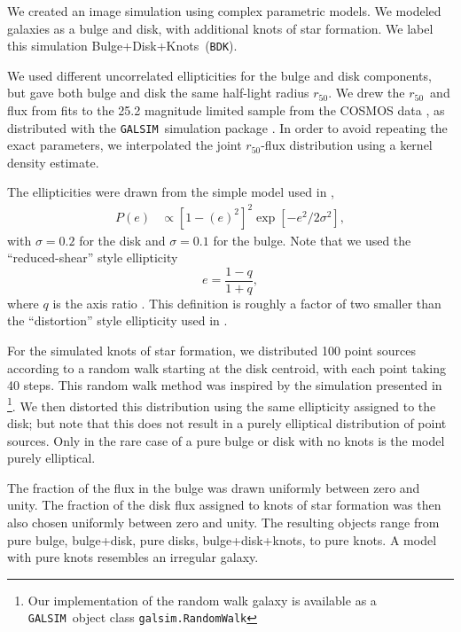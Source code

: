 \documentclass[iop, twocolappendix, appendixfloats, numberedappendix, apj]{emulateapj}
\newcommand{\hlr}{$r_{50}$}
\newcommand{\bdkfull}{Bulge+Disk+Knots}
\newcommand{\bdksim}{\texttt{BDK}}
\newcommand{\galsim}{\texttt{GALSIM}}
\begin{document}
We created an image simulation using complex parametric models.  We modeled
galaxies as a bulge and disk, with additional knots of star formation.  We
label this simulation \bdkfull\ (\bdksim).

We used different uncorrelated ellipticities for the bulge and disk
components, but gave both bulge and disk the same half-light radius \hlr.
We drew the \hlr\ and flux from fits \citep{LacknerGunn2012} to the 25.2
magnitude limited sample from the COSMOS data
\citep{Scoville2007a,Scoville2007b}, as distributed with the \galsim\
simulation package \citep{GALSIM2015}.  In order to avoid repeating the exact
parameters, we interpolated the joint \hlr-flux distribution using a kernel
density estimate.

The ellipticities were drawn from the simple model used in \cite{bfd2016},
\begin{align} \label{eq:edist}
    P(e) &\propto \left[1-(e)^2\right]^2 \exp\left[-e^2/2\sigma^2\right],
\end{align}
with $\sigma=0.2$ for the disk and $\sigma=0.1$ for the bulge.  Note that we
used the ``reduced-shear'' style ellipticity
\begin{equation}
    e = \frac{1-q}{1+q},
\end{equation}
where $q$ is the axis ratio \citep{bj02}.  This definition is roughly a
factor of two smaller than the ``distortion'' style ellipticity
used in \citet{bfd2016}.

For the simulated knots of star formation, we distributed 100 point sources
according to a random walk starting at the disk centroid, with each point
taking 40 steps.  This random walk method was inspired by the simulation
presented in \cite{Zhang2008FourierQuadI}\footnote{Our implementation of the
random walk galaxy is available as a \galsim\ object class
\texttt{galsim.RandomWalk}}.  We then distorted this distribution using the
same ellipticity assigned to the disk; but note that this does not result in a
purely elliptical distribution of point sources.  Only in the rare case of a
pure bulge or disk with no knots is the model purely elliptical.

The fraction of the flux in the bulge was drawn uniformly between zero and
unity.  The fraction of the disk flux assigned to knots of star formation
was then also chosen uniformly between zero and unity.  The resulting 
objects range from pure bulge, bulge+disk, pure disks, bulge+disk+knots, 
to pure knots. A model with pure knots resembles an irregular galaxy.
\end{document}
